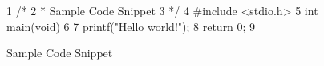 \begin{figure}
{ \scriptsize
\begin{verbbox}
  1 /*
  2  * Sample Code Snippet
  3  */
  4  #include <stdio.h>
  5  int main(void)
  6  {
  7    printf("Hello world!\n");
  8    return 0;
  9  }
\end{verbbox}
}
\centering
\theverbbox
\caption{Sample Code Snippet}
\label{fig:app:styleguide:Sample Code Snippet}
\end{figure}
